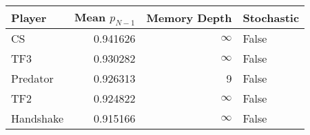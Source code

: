 \begin{tabular}{lrrl}
\toprule
    Player &  Mean $p_{N-1}$ &  Memory Depth & Stochastic \\
\midrule
        CS &        0.941626 &            \(\infty\) &      False \\
       TF3 &        0.930282 &            \(\infty\) &      False \\
  Predator &        0.926313 &             9 &      False \\
       TF2 &        0.924822 &            \(\infty\) &      False \\
 Handshake &        0.915166 &            \(\infty\) &      False \\
\bottomrule
\end{tabular}
